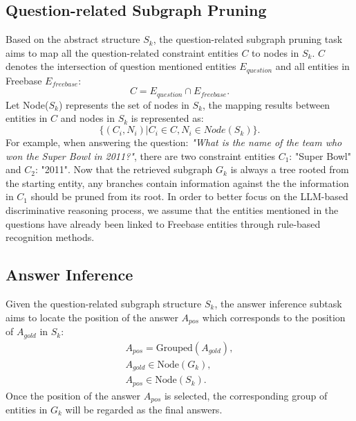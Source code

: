 \documentclass[11pt]{article}
\begin{document}
\subsection{Question-related Subgraph Pruning}
Based on the abstract structure $S_{k}$, the question-related subgraph pruning task aims to map all the question-related constraint entities $C$ to nodes in $S_{k}$.
$C$ denotes the intersection of question mentioned entities $E_{question}$ and all entities in Freebase $E_{freebase}$: 
\begin{equation}
C = E_{question} \cap E_{freebase}.
\end{equation}
Let Node($S_k$) represents the set of nodes in $S_k$, the mapping results between entities in $C$ and nodes in $S_k$ is represented as:
\begin{equation}
\{(C_i,N_i)|C_i \in C, N_i \in Node(S_{k})\}.
\end{equation}
For example, when answering the question: \textit{"What is the name of the team who won the Super Bowl in 2011?"}, there are two constraint entities $C_{1}$: "Super Bowl" and $C_{2}$: "2011". Now that the retrieved subgraph $G_k$ is always a tree rooted from the starting entity, any branches contain information against the the information in $C_{1}$ should be pruned from its root. In order to better focus on the LLM-based discriminative reasoning process, we assume that the entities mentioned in the questions have already been linked to Freebase entities through rule-based recognition methods.

\subsection{Answer Inference}

Given the question-related subgraph structure $S_{k}$, the answer inference subtask aims to locate the position of the answer $A_{pos}$ which corresponds to the position of $A_{gold}$ in $S_k$:
\begin{equation}
\begin{aligned}
A_{pos} = \text{Grouped}(A_{gold}),\\
A_{gold} \in \text{Node}(G_k),\\
A_{pos} \in \text{Node}(S_k).
\end{aligned}
\end{equation}
Once the position of the answer $A_{pos}$ is selected, the corresponding group of entities in $G_k$ will be regarded as the final answers.


\end{document}
